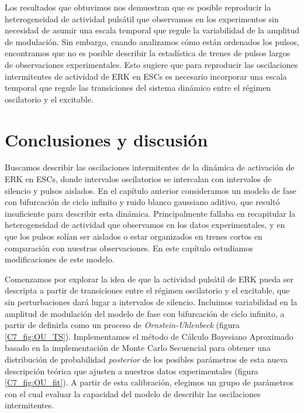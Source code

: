 \documentclass[./main.tex]{subfiles}
\begin{document}
Los resultados que obtuvimos nos demuestran que es posible reproducir la heterogeneidad de actividad pulsátil que observamos en los experimentos sin necesidad de asumir una escala temporal que regule la variabilidad de la amplitud de modulación. Sin embargo, cuando analizamos cómo están ordenados los pulsos, encontramos que no es posible describir la estadística de trenes de pulsos largos de observaciones experimentales. Esto sugiere que para reproducir las oscilaciones intermitentes de actividad de ERK en ESCs es necesario incorporar una escala temporal que regule las transiciones del sistema dinámico entre el régimen oscilatorio y el excitable. 


\section{Conclusiones y discusión}


Buscamos describir las oscilaciones intermitentes de la dinámica de activación de ERK en ESCs, donde intervalos oscilatorios se intercalan con intervalos de silencio y pulsos aislados. En el capítulo anterior consideramos un modelo de fase con bifurcación de ciclo infinito y ruido blanco gaussiano aditivo, que resultó insuficiente para describir esta dinámica. Principalmente fallaba en recapitular la heterogeneidad de actividad que observamos en los datos experimentales, y en que los pulsos solían ser aislados o estar organizados en trenes cortos en comparación con nuestras observaciones. En este capítulo estudiamos modificaciones de este modelo. 

Comenzamos por explorar la idea de que la actividad pulsátil de ERK pueda ser descripta a partir de transiciones entre el régimen oscilatorio y el excitable, que sin perturbaciones dará lugar a intervalos de silencio. Incluimos variabilidad en la amplitud de modulación del modelo de fase con bifurcación de ciclo infinito, a partir de definirla como un proceso de \textit{Ornstein-Uhlenbeck} (figura \ref{C7_fig:OU_TS}). 
Implementamos el método de Cálculo Bayesiano Aproximado basado en la implementación de Monte Carlo Secuencial para obtener una distribución de probabilidad \textit{posterior} de los posibles parámetros de esta nueva descripción teórica que ajusten a nuestros datos experimentales (figura  \ref{C7_fig:OU_fit}). A partir de esta calibración, elegimos un grupo de parámetros con el cual evaluar la capacidad del modelo de describir las oscilaciones intermitentes. 
\end{document}

